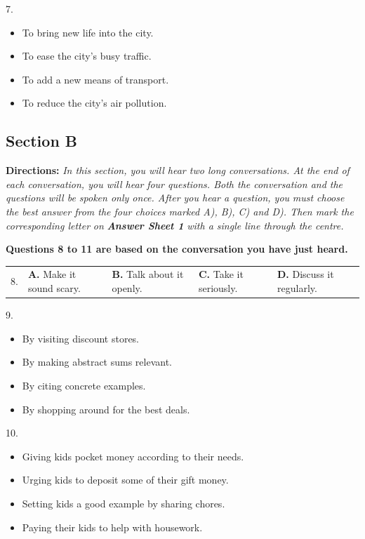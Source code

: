 \documentclass[UTF8,11pt]{ctexart}
\begin{document}
7.


\begin{itemize}[leftmargin=2em,itemsep=.2em,topsep=.4em]\item[A.] To bring new life into the city.
\item[B.] To ease the city’s busy traffic.
\item[C.] To add a new means of transport.
\item[D.] To reduce the city’s air pollution.
\end{itemize}

\subsection*{\textbf{Section B}}


\textbf{Directions:} \textit{In this section, you will hear two long conversations. At the end of each conversation, you will hear} \textit{four questions. Both the conversation and the questions will be spoken only once. After you hear a question, you} \textit{must choose the best answer from the four choices marked A), B), C) and D). Then mark the corresponding letter} \textit{on }\textbf{\textit{Answer Sheet 1}}\textit{ with a single line through the centre.}


\textbf{Questions 8 to 11 are based on the conversation you have just heard.}


\noindent\begin{tabularx}{\linewidth}{@{}lXXXX@{}}8. & \textbf{A.} Make it sound scary. & \textbf{B.} Talk about it openly. & \textbf{C.} Take it seriously. & \textbf{D.} Discuss it regularly.\\\end{tabularx}\par

9.


\begin{itemize}[leftmargin=2em,itemsep=.2em,topsep=.4em]\item[A.] By visiting discount stores.
\item[B.] By making abstract sums relevant.
\item[C.] By citing concrete examples.
\item[D.] By shopping around for the best deals.
\end{itemize}

10.


\begin{itemize}[leftmargin=2em,itemsep=.2em,topsep=.4em]\item[A.] Giving kids pocket money according to their needs.
\item[B.] Urging kids to deposit some of their gift money.
\item[C.] Setting kids a good example by sharing chores.
\item[D.] Paying their kids to help with housework.
\end{itemize}
\end{document}

